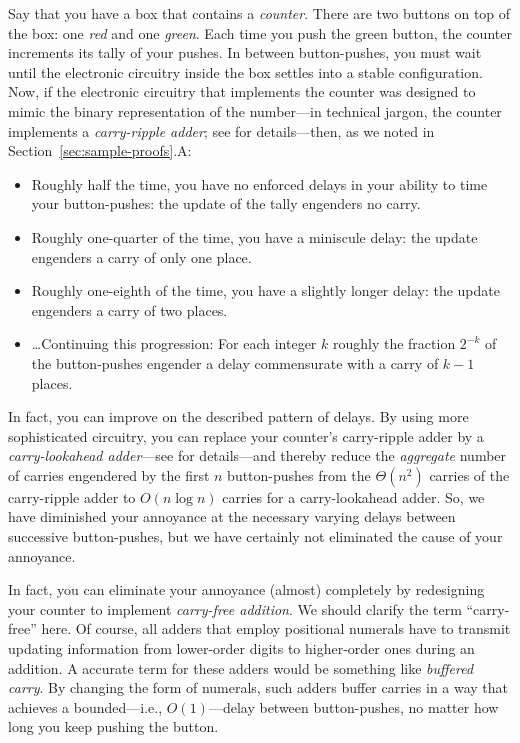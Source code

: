 Say that you have a box that contains a {\it counter}.  There are two
buttons on top of the box: one {\em red} and one {\em green}.  Each time you push
the green button, the counter increments its tally of your pushes.  In
between button-pushes, you must wait until the electronic circuitry
inside the box settles into a stable configuration.  Now, if the
electronic circuitry that implements the counter was designed to mimic
the binary representation of the number---in technical jargon,
 the counter implements a {\it carry-ripple
  adder}; see \cite{Hwang79} for details---then, as we noted in
Section~\ref{sec:sample-proofs}.A:
\begin{itemize}
\item
Roughly half the time, you have no enforced delays in your ability to
time your button-pushes: the update of the tally engenders no carry.
\item
Roughly one-quarter of the time, you have a miniscule delay: the
update engenders a carry of only one place.
\item
Roughly one-eighth of the time, you have a slightly longer delay: the
update engenders a carry of two places.
\item
\ldots Continuing this progression: For each integer $k$ roughly the
fraction $2^{-k}$ of the button-pushes engender a delay commensurate
with a carry of $k-1$ places.
\end{itemize}
In fact, you can improve on the described pattern of delays.  By using
more sophisticated circuitry, you can replace your counter's
carry-ripple adder by a {\it carry-lookahead adder}---see
\cite{Hwang79} for details---and thereby reduce the {\em aggregate}
number of carries engendered by the first $n$ button-pushes from the
$\Theta(n^2)$ carries of the carry-ripple adder to $O(n \log n)$
carries for a carry-lookahead adder.  So, we have diminished your
annoyance at the necessary varying delays between successive
button-pushes, but we have certainly not eliminated the cause of your
annoyance.

In fact, you can eliminate your annoyance (almost) completely by
redesigning your counter to implement {\it carry-free addition}.
 We should clarify the term ``carry-free''
here.  Of course, all adders that employ positional numerals have to
transmit updating information from lower-order digits to higher-order
ones during an addition.  A accurate term for these adders would be
something like {\em buffered carry}.  By changing the form of
numerals, such adders buffer carries in a way that achieves a
bounded---i.e., $O(1)$---delay between button-pushes, no matter how
long you keep pushing the button.

